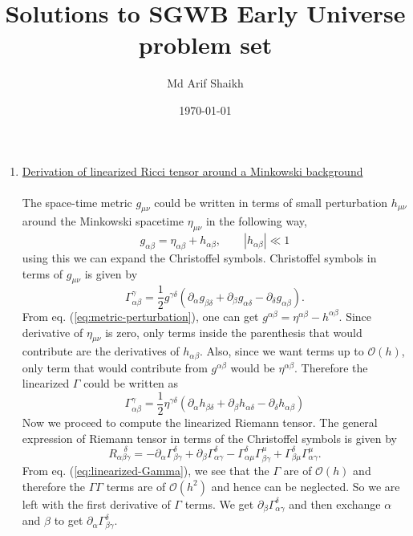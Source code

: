 \documentclass[10pt]{article}
\begin{document}
\title{Solutions to SGWB Early Universe problem set}
\author{Md Arif Shaikh}
\date{\today}
\maketitle

\begin{enumerate}
    \item \underline{Derivation of linearized Ricci tensor around a Minkowski background}\\\\
    The space-time metric $g_{\mu\nu}$ could be written in terms of small perturbation $h_{\mu\nu}$ around the Minkowski spacetime $\eta_{\mu\nu}$ in the following way,
    \begin{equation}
        \label{eq:metric-perturbation}
        g_{\alpha\beta} = \eta_{\alpha\beta} + h_{\alpha\beta},\qquad |h_{\alpha\beta}|\ll 1
    \end{equation}
    using this we can expand the Christoffel symbols. Christoffel symbols in terms of $g_{\mu\nu}$ is given by
    \begin{equation}
        \label{eq:Christofell-symbols}
        \Gamma^{\gamma}_{\alpha\beta} = \frac{1}{2}g^{\gamma\delta}(\partial_\alpha g_{\beta\delta} + \partial_\beta g_{\alpha\delta} - \partial_\delta g_{\alpha\beta}).
    \end{equation}
    From eq. (\ref{eq:metric-perturbation}), one can get $g^{\alpha\beta} = \eta^{\alpha\beta} - h^{\alpha\beta}$. Since derivative of $\eta_{\mu\nu}$ is zero, only terms inside the parenthesis that would contribute are the derivatives of $h_{\alpha\beta}$. Also, since we want terms up to $\mathcal{O}(h)$, only term that would contribute from $g^{\alpha\beta}$ would be $\eta^{\alpha\beta}$. Therefore the linearized $\Gamma$ could be written as
    \begin{equation}
        \label{eq:linearized-Gamma}
        \Gamma^{\gamma}_{\alpha\beta} = \frac{1}{2}\eta^{\gamma\delta}(\partial_\alpha h_{\beta\delta} + \partial_\beta h_{\alpha\delta} - \partial_\delta h_{\alpha\beta})
    \end{equation}
    Now we proceed to compute the linearized Riemann tensor. The general expression of Riemann tensor in terms of the Christoffel symbols is given by
    \begin{equation}
        \label{eq:Riemman-tensor}
        R_{\alpha\beta\gamma}^{~~~~\delta} = -\partial_\alpha\Gamma^{\delta}_{\beta\gamma} + \partial_\beta\Gamma^{\delta}_{\alpha\gamma} - \Gamma^{\delta}_{\alpha\mu}\Gamma^{\mu}_{\beta\gamma} + \Gamma^{\delta}_{\beta\mu}\Gamma^{\mu}_{\alpha\gamma}.
    \end{equation}
    From eq. (\ref{eq:linearized-Gamma}), we see that the $\Gamma$ are of $\mathcal{O}(h)$ and therefore the $\Gamma\Gamma$ terms are of $\mathcal{O}(h^2)$ and hence can be neglected. So we are left with the first derivative of $\Gamma$ terms. We get $\partial_\beta \Gamma^{\delta}_{\alpha\gamma}$ and then exchange $\alpha$ and $\beta$ to get $\partial_\alpha\Gamma^{\delta}_{\beta\gamma}$.
    

\end{enumerate}
\end{document}
